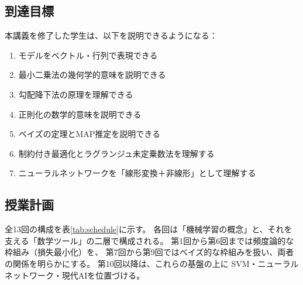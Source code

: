 \subsection{到達目標}

本講義を修了した学生は、以下を説明できるようになる：
\begin{enumerate}
  \item モデルをベクトル・行列で表現できる
  \item 最小二乗法の幾何学的意味を説明できる
  \item 勾配降下法の原理を理解できる
  \item 正則化の数学的意味を説明できる
  \item ベイズの定理とMAP推定を説明できる
  \item 制約付き最適化とラグランジュ未定乗数法を理解する
  \item ニューラルネットワークを「線形変換＋非線形」として理解する
\end{enumerate}

\subsection{授業計画}

全13回の構成を表\ref{tab:schedule}に示す。
各回は「機械学習の概念」と、それを支える「数学ツール」の二層で構成される。
第1回から第6回までは頻度論的な枠組み（損失最小化）を、
第7回から第9回ではベイズ的な枠組みを扱い、両者の関係を明らかにする。
第10回以降は、これらの基盤の上に SVM・ニューラルネットワーク・現代AIを位置づける。

